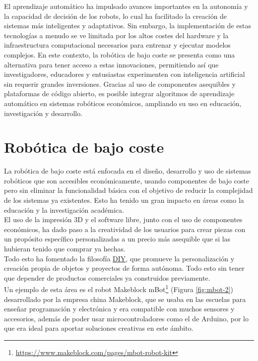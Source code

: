 El aprendizaje automático ha impulsado avances importantes en la autonomía y la capacidad de decisión de los robots, lo cual ha facilitado la creación de sistemas más inteligentes y adaptativos. Sin embargo, la implementación de estas tecnologías a menudo se ve limitada por los altos costes del hardware y la infraestructura computacional necesarios para entrenar y ejecutar modelos complejos. En este contexto, la robótica de bajo coste se presenta como una alternativa para tener acceso a estas innovaciones, permitiendo así que investigadores, educadores y entusiastas experimenten con inteligencia artificial sin requerir grandes inversiones. Gracias al uso de componentes asequibles y plataformas de código abierto, es posible integrar algoritmos de aprendizaje automático en sistemas robóticos económicos, ampliando su uso en educación, investigación y desarrollo.

 
\label{sec:cuartaseccion}


\section{Robótica de bajo coste}
\label{sec:quintaseccion}

La robótica de bajo coste está enfocada en el diseño, desarrollo y uso de sistemas robóticos que son accesibles económicamente, usando componentes de bajo coste pero sin eliminar la funcionalidad básica con el objetivo de reducir la complejidad de los sistemas ya existentes. Esto ha tenido un gran impacto en áreas como la educación y la investigación académica.\\

El uso de la impresión 3D y el software libre, junto con el uso de componentes económicos, ha dado paso a la creatividad de los usuarios para crear piezas con un propósito específico personalizadas a un precio más asequible que si las hubieran tenido que comprar ya hechas.\\


Todo esto ha fomentado la filosofía \hyperlink{DIY}{DIY}, que promueve la personalización y creación propia de objetos y proyectos de forma autónoma. Todo esto sin tener que depender de productos comerciales ya construidos previamente.\\

Un ejemplo de esta área es el robot Makeblock mBot\footnote{\url{https://www.makeblock.com/pages/mbot-robot-kit}} (Figura \ref{fig:mbot-2}) desarrollado por la empresa china Makeblock, que se usaba en las escuelas para enseñar programación y electrónica y era compatible con muchos sensores y accesorios, además de poder usar microcontroladores como el de Arduino, por lo que era ideal para aportar soluciones creativas en este ámbito.

